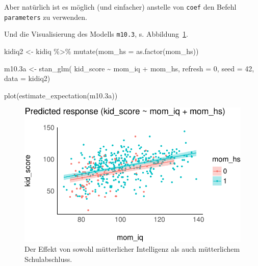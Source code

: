\documentclass[
  a4paper,
  DIV=11]{scrreprt}
\newenvironment{Shaded}{\begin{snugshade}}{\end{snugshade}}
\newcommand{\AttributeTok}[1]{\textcolor[rgb]{0.40,0.45,0.13}{#1}}
\newcommand{\DecValTok}[1]{\textcolor[rgb]{0.68,0.00,0.00}{#1}}
\newcommand{\FloatTok}[1]{\textcolor[rgb]{0.68,0.00,0.00}{#1}}
\newcommand{\FunctionTok}[1]{\textcolor[rgb]{0.28,0.35,0.67}{#1}}
\newcommand{\NormalTok}[1]{\textcolor[rgb]{0.00,0.23,0.31}{#1}}
\newcommand{\OtherTok}[1]{\textcolor[rgb]{0.00,0.23,0.31}{#1}}
\newcommand{\SpecialCharTok}[1]{\textcolor[rgb]{0.37,0.37,0.37}{#1}}
\theoremstyle{definition}
\theoremstyle{remark}
\begin{document}
Aber natürlich ist es möglich (und einfacher) anstelle von \texttt{coef}
den Befehl \texttt{parameters} zu verwenden.

Und die Visualisierung des Modells \texttt{m10.3}, s.
Abbildung~\ref{fig-m103}.

\begin{Shaded}
\begin{Highlighting}[]
\NormalTok{kidiq2 }\OtherTok{\textless{}{-}}
\NormalTok{  kidiq }\SpecialCharTok{\%\textgreater{}\%} 
  \FunctionTok{mutate}\NormalTok{(}\AttributeTok{mom\_hs =} \FunctionTok{as.factor}\NormalTok{(mom\_hs))}

\NormalTok{m10}\FloatTok{.3}\NormalTok{a }\OtherTok{\textless{}{-}} 
  \FunctionTok{stan\_glm}\NormalTok{(}
\NormalTok{    kid\_score }\SpecialCharTok{\textasciitilde{}}\NormalTok{ mom\_iq }\SpecialCharTok{+}\NormalTok{ mom\_hs, }
    \AttributeTok{refresh =} \DecValTok{0}\NormalTok{,}
    \AttributeTok{seed =} \DecValTok{42}\NormalTok{,}
    \AttributeTok{data =}\NormalTok{ kidiq2)}

\FunctionTok{plot}\NormalTok{(}\FunctionTok{estimate\_expectation}\NormalTok{(m10}\FloatTok{.3}\NormalTok{a))}
\end{Highlighting}
\end{Shaded}

\begin{figure}[H]

{\centering \includegraphics{./metrische-AV_files/figure-pdf/fig-m103-1.pdf}

}

\caption{\label{fig-m103}Der Effekt von sowohl mütterlicher Intelligenz
als auch mütterlichem Schulabschluss.}

\end{figure}
\end{document}
